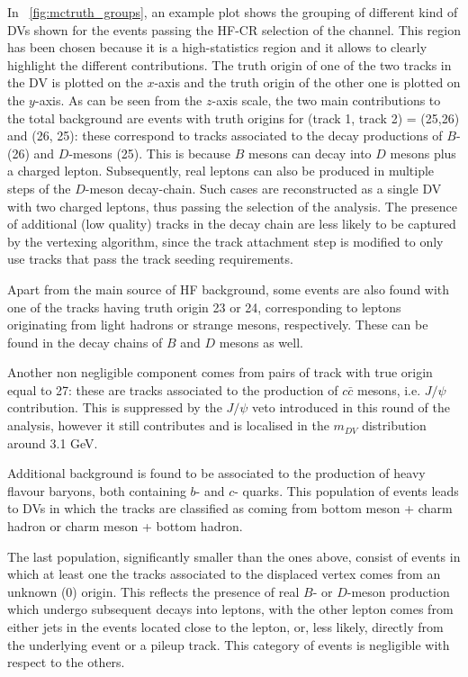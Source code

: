 In ~\cref{fig:mctruth_groups}, an example plot shows the grouping of different kind of DVs shown for the events passing the HF-CR selection of the \uuu channel. This region has been chosen because it is a high-statistics region and it allows to clearly highlight the different contributions. The truth origin of one of the two tracks in the DV is plotted on the $x$-axis and the truth origin of the other one is plotted on the $y$-axis. As can be seen from the $z$-axis scale, the two main contributions to the total background are events with truth origins for (track 1, track 2) = (25,26) and (26, 25): these correspond to tracks associated to the decay productions of $B$- (26) and $D$-mesons (25). This is because $B$ mesons can decay into $D$ mesons plus a charged lepton. Subsequently, real leptons can also be produced in multiple steps of the $D$-meson decay-chain. Such cases are reconstructed as a single DV with two charged leptons, thus passing the selection of the analysis. The presence of additional (low quality) tracks in the decay chain are less likely to be captured by the vertexing algorithm, since the track attachment step is modified to only use tracks that pass the track seeding requirements.

Apart from the main source of HF background, some events are also found with one of the tracks having truth origin 23 or 24, corresponding to leptons originating from light hadrons or strange mesons, respectively. These can be found in the decay chains of $B$ and $D$ mesons as well. 

Another non negligible component comes from pairs of track with true origin equal to 27: these are tracks associated to the production of $c\bar{c}$ mesons, i.e. $J/\psi$ contribution. This is suppressed by the $J/\psi$ veto introduced in this round of the analysis, however it still contributes and is localised in the $m_{DV}$ distribution around 3.1 GeV.

Additional background is found to be associated to the production of heavy flavour baryons, both containing $b$- and $c$- quarks. This population of events leads to DVs in which the tracks are classified as coming from bottom meson + charm hadron or charm meson + bottom hadron. 

The last population, significantly smaller than the ones above, consist of events in which at least one the tracks associated to the displaced vertex comes from an unknown (0) origin. This reflects the presence of real $B$- or $D$-meson production which undergo subsequent decays into leptons, with the other lepton comes from either jets in the events located close to the lepton, or, less likely, directly from the underlying event or a pileup track. This category of events is negligible with respect to the others.

